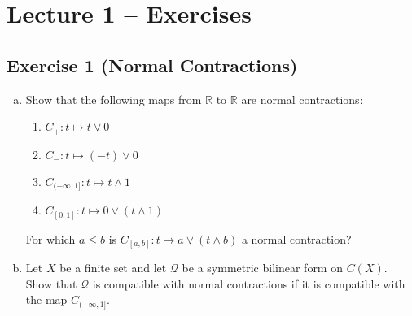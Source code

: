 \section{Lecture 1 -- Exercises}

\subsection{Exercise 1 (Normal Contractions)}
\begin{enumerate}[(a)]
	\item
		Show that the following maps from $\mathbb{R}$ to $\mathbb{R}$ are normal contractions:
		\begin{enumerate}
			\item 
				$C_{+}:t\mapsto t\vee 0$
			\item 
				$C_{-}:t\mapsto (-t)\vee 0$
			\item 
				$C_{(-\infty,1]}:t\mapsto t\wedge 1$
			\item 
				$C_{[0,1]}:t\mapsto 0\vee(t\wedge 1)$
		\end{enumerate}
		For which $a\leq b$ is $C_{[a,b]}:t\mapsto a\vee(t\wedge b)$ a normal contraction?

	\item 
		Let $X$ be a finite set and let $\mathcal{Q}$ be a symmetric bilinear form on $C(X)$. Show that $\mathcal{Q}$ is compatible with normal contractions if it is compatible with the map $C_{(-\infty,1]}$.
\end{enumerate}

